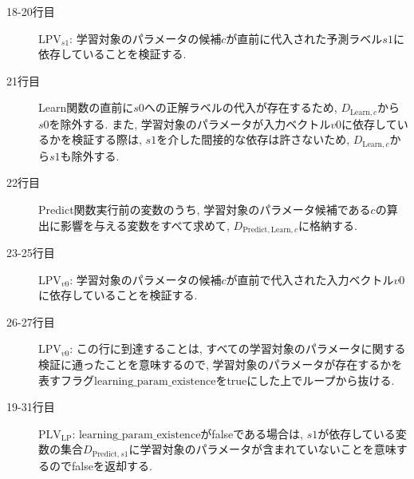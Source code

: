 \documentclass[11pt,oneside,openany,report]{jsbook}
\begin{document}
\begin{description}
\begin{description}
      \item[18-20行目] $\mathrm{LPV}_{s1}$: 学習対象のパラメータの候補$c$が直前に代入された予測ラベル$s1$に依存していることを検証する.
      \item[21行目] Learn関数の直前に$s0$への正解ラベルの代入が存在するため, $D_{\mathrm{Learn}, c}$から$s0$を除外する. また, 学習対象のパラメータが入力ベクトル$v0$に依存しているかを検証する際は, $s1$を介した間接的な依存は許さないため, $D_{\mathrm{Learn}, c}$から$s1$も除外する.
      \item[22行目] Predict関数実行前の変数のうち, 学習対象のパラメータ候補である$c$の算出に影響を与える変数をすべて求めて, $D_{\mathrm{Predict}, \mathrm{Learn}, c}$に格納する.
      \item[23-25行目] $\mathrm{LPV}_{v0}$: 学習対象のパラメータの候補$c$が直前で代入された入力ベクトル$v0$に依存していることを検証する.
      \item[26-27行目] $\mathrm{LPV}_{v0}$: この行に到達することは, すべての学習対象のパラメータに関する検証に通ったことを意味するので, 学習対象のパラメータが存在するかを表すフラグ$\mathrm{learning\_param\_existence}$をtrueにした上でループから抜ける.
      \item[19-31行目] $\mathrm{PLV}_\mathrm{LP}$: $\mathrm{learning\_param\_existence}$がfalseである場合は, $s1$が依存している変数の集合$D_{\mathrm{Predict},s1}$に学習対象のパラメータが含まれていないことを意味するのでfalseを返却する.
    \end{description}
\end{description}
\end{document}
